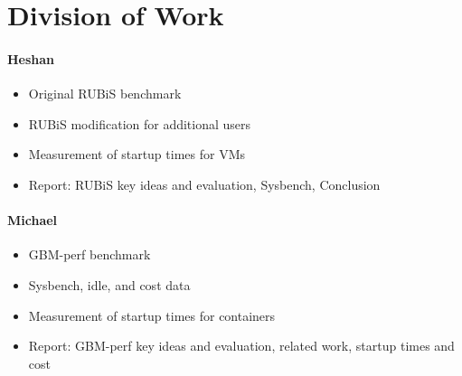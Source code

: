 \documentclass[11pt]{article}
\begin{document}
\vspace{3mm} %


\section{Division of Work}

\paragraph{Heshan}

\begin{itemize}
  \item Original RUBiS benchmark
  \item RUBiS modification for additional users
  \item Measurement of startup times for VMs
  \item Report: RUBiS key ideas and evaluation, Sysbench, Conclusion
\end{itemize}

\paragraph{Michael}

\begin{itemize}
  \item GBM-perf benchmark
  \item Sysbench, idle, and cost data
  \item Measurement of startup times for containers
  \item Report: GBM-perf key ideas and evaluation, related work, startup times and cost
\end{itemize}


\printbibliography
\end{document}

